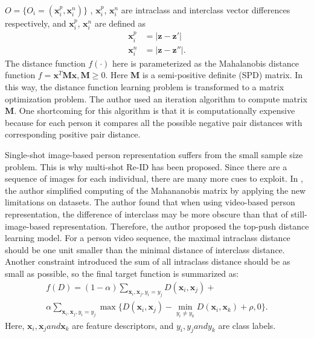 $O=\{O_i=(\bm{x}_i^p, \bm{x}_i^n)\}$ , $\bm{x}_i^p$, $\bm{x}_i^n$ are intraclass and interclass vector differences respectively, and $\bm{x}_i^p$, $\bm{x}_i^n$ are defined as
\begin{equation}
\begin{aligned}
\bm{x}_i^p &= |\bm{z} - \bm{z}'| \\
\bm{x}_i^n &= |\bm{z} - \bm{z}''|.
\end{aligned}
\end{equation}
The distance function $f(\cdot)$ here is parameterized as the Mahalanobis distance function
$f=\bm{x}^T\bm{M}\bm{x},\bm{M\ge}0$. Here $\bm{M}$ is a semi-positive definite (SPD) matrix. In this way, the distance function learning problem is transformed to a matrix optimization problem. The author used an iteration algorithm to compute matrix $\bm{M}$. One shortcoming for this algorithm is that it is computationally expensive because for each person it compares all the possible negative pair distances with corresponding positive pair distance. 

Single-shot image-based person representation suffers from the small sample size problem. This is why multi-shot Re-ID has been proposed. Since there are a sequence of images for each individual, there are many more cues to exploit.
In \cite{TDL}, the author simplified computing of the Mahananobis matrix by applying the new limitations on datasets. The author found that when using video-based person representation, the difference of interclass may be more obscure than that of still-image-based representation. Therefore, the author proposed the top-push distance learning model. For a person video sequence, the maximal intraclass distance should be one unit smaller than the minimal distance of interclass distance. Another constraint introduced the sum of all intraclass distance should be as small as possible, so the final target function is summarized as:
\begin{equation}
\begin{aligned}
f(D) = (1-\alpha)\sum_{\bm{x}_i,\bm{x}_j,y_i=y_j} D(\bm{x}_i,\bm{x}_j) + \\
\alpha \sum_{\bm{x}_i,\bm{x}_j,y_i=y_j}\max\{{D(\bm{x}_i,\bm{x}_j)-\min_{y_i\ne y_k}{D(\bm{x}_i,\bm{x}_k)}+\rho,0}\}.
\end{aligned}
\end{equation}
Here, $\bm{x}_i, \bm{x}_j and \bm{x}_k$ are feature descriptors, and $y_i, y_j and y_k$ are class labels.

